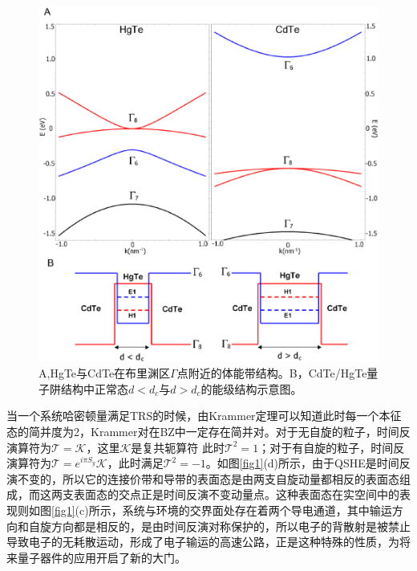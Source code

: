 \begin{figure}[h]
	\centering
	\includegraphics[scale=0.35]{pic/fig2.eps}
	\caption{A,HgTe与CdTe在布里渊区$\Gamma$点附近的体能带结构。B，CdTe/HgTe量子阱结构中正常态$d<d_c$与$d>d_c$的能级结构示意图\cite{re4}。}\label{fig2}
\end{figure}

 当一个系统哈密顿量满足TRS的时候，由Krammer定理可以知道此时每一个本征态的简并度为2，Krammer对在BZ中一定存在简并对。对于无自旋的粒子，时间反演算符为$\mathcal{T}=\mathcal{K}$，这里$\mathcal{K}$是复共轭算符 此时$\mathcal{T}^2=1$；对于有自旋的粒子，时间反演算符为$\mathcal{T}=e^{i\pi S_y}\mathcal{K}$，此时满足$\mathcal{T}^2=-1$。如图\ref{fig1}(d)所示，由于QSHE是时间反演不变的，所以它的连接价带和导带的表面态是由两支自旋动量都相反的表面态组成，而这两支表面态的交点正是时间反演不变动量点。这种表面态在实空间中的表现则如图\ref{fig1}(c)所示，系统与环境的交界面处存在着两个导电通道，其中输运方向和自旋方向都是相反的，是由时间反演对称保护的，所以电子的背散射是被禁止导致电子的无耗散运动，形成了电子输运的高速公路，正是这种特殊的性质，为将来量子器件的应用开启了新的大门。

